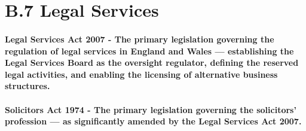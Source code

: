 \section*{B.7 Legal Services}
\paragraph{\textbf{Legal Services Act 2007} - The primary legislation governing the regulation of legal services in England and Wales — establishing the Legal Services Board as the oversight regulator, defining the reserved legal activities, and enabling the licensing of alternative business structures.}
\paragraph{\textbf{Solicitors Act 1974} - The primary legislation governing the solicitors' profession — as significantly amended by the Legal Services Act 2007.}